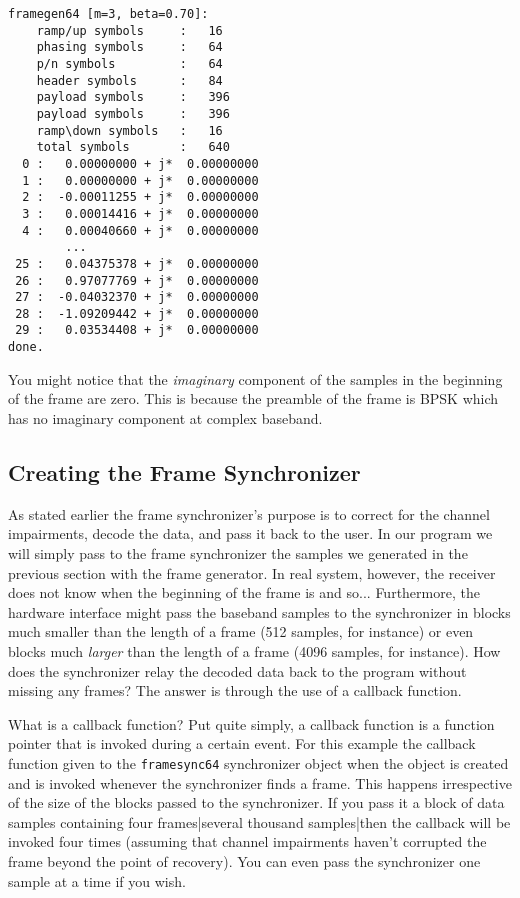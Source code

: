 %
\begin{Verbatim}[fontsize=\small]
framegen64 [m=3, beta=0.70]:
    ramp/up symbols     :   16
    phasing symbols     :   64
    p/n symbols         :   64
    header symbols      :   84
    payload symbols     :   396
    payload symbols     :   396
    ramp\down symbols   :   16
    total symbols       :   640
  0 :   0.00000000 + j*  0.00000000
  1 :   0.00000000 + j*  0.00000000
  2 :  -0.00011255 + j*  0.00000000
  3 :   0.00014416 + j*  0.00000000
  4 :   0.00040660 + j*  0.00000000
        ...
 25 :   0.04375378 + j*  0.00000000
 26 :   0.97077769 + j*  0.00000000
 27 :  -0.04032370 + j*  0.00000000
 28 :  -1.09209442 + j*  0.00000000
 29 :   0.03534408 + j*  0.00000000
done.
\end{Verbatim}
%
You might notice that the {\em imaginary} component of the samples in
the beginning of the frame are zero.
This is because the preamble of the frame is BPSK which has no imaginary
component at complex baseband.

%
%
\subsection{Creating the Frame Synchronizer}
\label{tutorial:framing:framesync}

As stated earlier the frame synchronizer's purpose is to correct for the
channel impairments, decode the data, and pass it back to the user.
In our program we will simply pass to the frame synchronizer the samples
we generated in the previous section with the frame generator.
In real system, however, the receiver does not know when the beginning
of the frame is and so...
Furthermore, the hardware interface might pass the baseband samples to
the synchronizer in blocks much smaller than the length of a frame
(512 samples, for instance)
or even blocks much {\em larger} than the length of a frame
(4096 samples, for instance).
How does the synchronizer relay the decoded data back to the program
without missing any frames?
The answer is through the use of a callback function.

What is a callback function?
Put quite simply, a callback function is a function pointer that is
invoked during a certain event.
For this example the callback function given to the {\tt framesync64}
synchronizer object when the object is created
and is invoked whenever the synchronizer finds a frame.
This happens irrespective of the size of the blocks passed to the
synchronizer.
If you pass it a block of data samples containing four frames|several
thousand samples|then the callback will be invoked four times
(assuming that channel impairments haven't corrupted the frame beyond
the point of recovery).
You can even pass the synchronizer one sample at a time if you wish.

